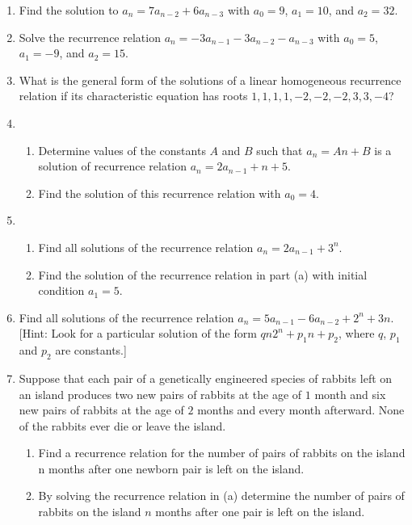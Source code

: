 \documentclass{../../cls/sig-alternate-05-2015}
\begin{document}
\begin{enumerate}
\item
Find the solution to $a_n=7a_{n-2}+6a_{n-3}$ with $a_0=9$, $a_1 = 10$, and $a_2=32$.

\item Solve the recurrence relation $a_n=-3a_{n-1} - 3a_{n-2} - a_{n-3}$ with $a_0 = 5$, $a_1 = -9$, and $a_2 = 15$.

\item What is the general form of the solutions of a linear homogeneous recurrence relation if its characteristic equation
has roots $1, 1, 1, 1, -2, -2, -2, 3, 3, -4$?

\item \begin{enumerate}
    \item Determine values of the constants $A$ and $B$ such
    that $a_n = An + B$ is a solution of recurrence relation $a_n = 2a_{n - 1} + n + 5$.
    \item Find the solution of this recurrence relation with
    $a_0 = 4$.
\end{enumerate}

\item \begin{enumerate}
    \item Find all solutions of the recurrence relation
    $a_n = 2a_{n-1} + 3^n$.
    \item Find the solution of the recurrence relation in part (a)
    with initial condition $a_1 = 5$.
\end{enumerate}

\item Find all solutions of the recurrence relation 
$a_n = 5a_{n-1} - 6a_{n-2} + 2^n + 3n$. 
[Hint: Look for a particular
solution of the form $qn2^n + p_1n + p_2$, where $q$, $p_1$ and
$p_2$ are constants.]

\item Suppose that each pair of a genetically engineered species
of rabbits left on an island produces two new pairs of rabbits at the age of $1$ month and six new pairs of rabbits at
the age of $2$ months and every month afterward. None of
the rabbits ever die or leave the island.
\begin{enumerate}
    \item Find a recurrence relation for the number of pairs of
    rabbits on the island n months after one newborn pair
    is left on the island.
    \item By solving the recurrence relation in (a) determine
    the number of pairs of rabbits on the island $n$ months
    after one pair is left on the island.
\end{enumerate}


\end{enumerate}
\end{document}
